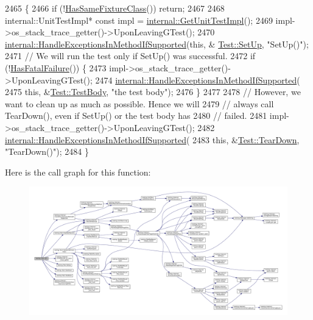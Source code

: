 \begin{DoxyCode}
2465                \{
2466   \textcolor{keywordflow}{if} (!\hyperlink{classtesting_1_1Test_a5daca5a35e33e8fbdf36b7b666668b34}{HasSameFixtureClass}()) \textcolor{keywordflow}{return};
2467 
2468   internal::UnitTestImpl* \textcolor{keyword}{const} impl = \hyperlink{namespacetesting_1_1internal_a9bd0caf5d16512de38b39599c13ee634}{internal::GetUnitTestImpl}();
2469   impl->os\_stack\_trace\_getter()->UponLeavingGTest();
2470   \hyperlink{namespacetesting_1_1internal_addb2ed165b92b74e25fe9ebe9e46b9f9}{internal::HandleExceptionsInMethodIfSupported}(\textcolor{keyword}{this}, &
      \hyperlink{classtesting_1_1Test_a57a4116f39f6636a80710ded7d42e889}{Test::SetUp}, \textcolor{stringliteral}{"SetUp()"});
2471   \textcolor{comment}{// We will run the test only if SetUp() was successful.}
2472   \textcolor{keywordflow}{if} (!\hyperlink{classtesting_1_1Test_aa8d0725cfb519f82eaf4fd2d2f46d97d}{HasFatalFailure}()) \{
2473     impl->os\_stack\_trace\_getter()->UponLeavingGTest();
2474     \hyperlink{namespacetesting_1_1internal_addb2ed165b92b74e25fe9ebe9e46b9f9}{internal::HandleExceptionsInMethodIfSupported}(
2475         \textcolor{keyword}{this}, &\hyperlink{classtesting_1_1Test_a146a4a5d9854e676d625a0ef67409794}{Test::TestBody}, \textcolor{stringliteral}{"the test body"});
2476   \}
2477 
2478   \textcolor{comment}{// However, we want to clean up as much as possible.  Hence we will}
2479   \textcolor{comment}{// always call TearDown(), even if SetUp() or the test body has}
2480   \textcolor{comment}{// failed.}
2481   impl->os\_stack\_trace\_getter()->UponLeavingGTest();
2482   \hyperlink{namespacetesting_1_1internal_addb2ed165b92b74e25fe9ebe9e46b9f9}{internal::HandleExceptionsInMethodIfSupported}(
2483       \textcolor{keyword}{this}, &\hyperlink{classtesting_1_1Test_a2889fd829b6c712d98fb3896d28f64a3}{Test::TearDown}, \textcolor{stringliteral}{"TearDown()"});
2484 \}
\end{DoxyCode}
Here is the call graph for this function\+:
\nopagebreak
\begin{figure}[H]
\begin{center}
\leavevmode
\includegraphics[width=350pt]{classtesting_1_1Test_a939ae280a6f2f1c3d43708ec616684ed_cgraph}
\end{center}
\end{figure}
